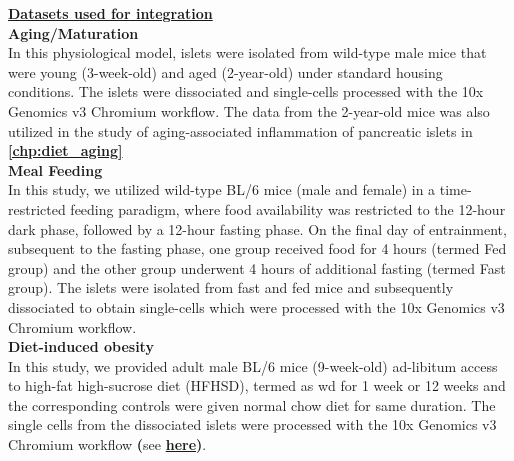 
\underline{\normalsize \textbf{Datasets used for integration}}\\


\textbf{Aging/Maturation\\}
In this physiological model, islets were isolated from wild-type male mice that were young (3-week-old) and aged (2-year-old) under standard housing conditions. The islets were dissociated and single-cells processed with the 10x Genomics v3 Chromium workflow. The data from the 2-year-old mice was also utilized in the study of aging-associated inflammation of pancreatic islets in \textbf{\autoref{chp:diet_aging}}\\

\textbf{Meal Feeding\\}
In this study, we utilized wild-type BL/6 mice (male and female) in a time-restricted feeding paradigm, where food availability was restricted to the 12-hour dark phase, followed by a 12-hour fasting phase. On the final day of entrainment, subsequent to the fasting phase, one group received food for 4 hours (termed Fed group) and the other group underwent 4 hours of additional fasting (termed Fast group). The islets were isolated from fast and fed mice and subsequently dissociated to obtain single-cells which were processed with the 10x Genomics v3 Chromium workflow.\\

\textbf{Diet-induced obesity\\}
In this study, we provided adult male BL/6 mice (9-week-old) ad-libitum access to high-fat high-sucrose diet (HFHSD), termed as \acrfull{wd} for 1 week or 12 weeks and the corresponding controls were given normal chow diet for same duration. The single cells from the dissociated islets were processed with the 10x Genomics v3 Chromium workflow \textbf{(}see \hyperref[subsec:met_chp2_scrdata]{\textbf{here}}\textbf{)}.\\


